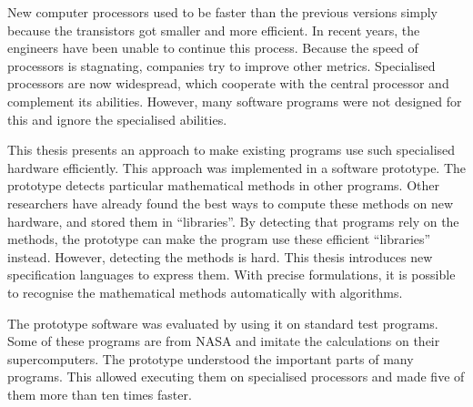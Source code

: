 
    New computer processors used to be faster than the previous versions simply
    because the transistors got smaller and more efficient.
    In recent years, the engineers have been unable to continue this process.
    Because the speed of processors is stagnating, companies try to improve
    other metrics.
    Specialised processors are now widespread, which cooperate with the central
    processor and complement its abilities.
    However, many software programs were not designed for this and ignore the
    specialised abilities.

    This thesis presents an approach to make existing programs use such
    specialised hardware efficiently.
    This approach was implemented in a software prototype.
    The prototype detects particular mathematical methods in other programs.
    Other researchers have already found the best ways to compute these
    methods on new hardware, and stored them in ``libraries''.
    By detecting that programs rely on the methods, the prototype can make the
    program use these efficient ``libraries'' instead.
    However, detecting the methods is hard.
    This thesis introduces new specification languages to express them.
    With precise formulations, it is possible to recognise the mathematical
    methods automatically with algorithms.

    The prototype software was evaluated by using it on standard test programs.
    Some of these programs are from NASA and imitate the calculations on their
    supercomputers.
    The prototype understood the important parts of many programs.
    This allowed executing them on specialised processors and made five of them
    more than ten times faster.
